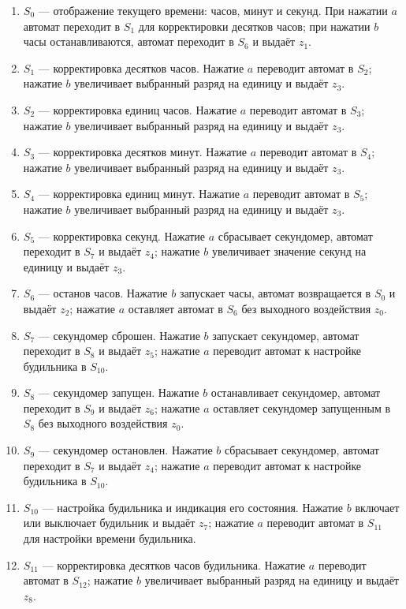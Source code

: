 \begin{enumerate}
    \item $S_0$ --- отображение текущего времени: часов, минут и секунд. При нажатии $a$ автомат переходит в $S_1$ для корректировки десятков часов; при нажатии $b$ часы останавливаются, автомат переходит в $S_6$ и выдаёт $z_1$.
    \item $S_1$ --- корректировка десятков часов. Нажатие $a$ переводит автомат в $S_2$; нажатие $b$ увеличивает выбранный разряд на единицу и выдаёт $z_3$.
    \item $S_2$ --- корректировка единиц часов. Нажатие $a$ переводит автомат в $S_3$; нажатие $b$ увеличивает выбранный разряд на единицу и выдаёт $z_3$.
    \item $S_3$ --- корректировка десятков минут. Нажатие $a$ переводит автомат в $S_4$; нажатие $b$ увеличивает выбранный разряд на единицу и выдаёт $z_3$.
    \item $S_4$ --- корректировка единиц минут. Нажатие $a$ переводит автомат в $S_5$; нажатие $b$ увеличивает выбранный разряд на единицу и выдаёт $z_3$.
    \item $S_5$ --- корректировка секунд. Нажатие $a$ сбрасывает секундомер, автомат переходит в $S_7$ и выдаёт $z_4$; нажатие $b$ увеличивает значение секунд на единицу и выдаёт $z_3$.
    \item $S_6$ --- останов часов. Нажатие $b$ запускает часы, автомат возвращается в $S_0$ и выдаёт $z_2$; нажатие $a$ оставляет автомат в $S_6$ без выходного воздействия $z_0$.
    \item $S_7$ --- секундомер сброшен. Нажатие $b$ запускает секундомер, автомат переходит в $S_8$ и выдаёт $z_5$; нажатие $a$ переводит автомат к настройке будильника в $S_{10}$.
    \item $S_8$ --- секундомер запущен. Нажатие $b$ останавливает секундомер, автомат переходит в $S_9$ и выдаёт $z_6$; нажатие $a$ оставляет секундомер запущенным в $S_8$ без выходного воздействия $z_0$.
    \item $S_9$ --- секундомер остановлен. Нажатие $b$ сбрасывает секундомер, автомат переходит в $S_7$ и выдаёт $z_4$; нажатие $a$ переводит автомат к настройке будильника в $S_{10}$.
    \item $S_{10}$ --- настройка будильника и индикация его состояния. Нажатие $b$ включает или выключает будильник и выдаёт $z_7$; нажатие $a$ переводит автомат в $S_{11}$ для настройки времени будильника.
    \item $S_{11}$ --- корректировка десятков часов будильника. Нажатие $a$ переводит автомат в $S_{12}$; нажатие $b$ увеличивает выбранный разряд на единицу и выдаёт $z_8$.

\end{enumerate}
